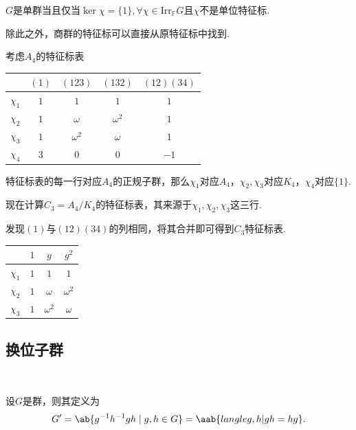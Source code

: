 \begin{theorem}[]
    $G$是单群当且仅当$\ker \chi = \{1\}, \forall \chi \in \mathrm{Irr}_{\mathbb{F}} G$且$\chi$不是单位特征标.
\end{theorem}

除此之外，商群的特征标可以直接从原特征标中找到.

\begin{instance}
    考虑$A_4$的特征标表
    \begin{center}
        \begin{tabular}{c|cccc}
                     & $(1)$ & $(123)$    & $(132)$    & $(12)(34)$ \\ \hline
            $\chi_1$ & $1$   & $1$        & $1$        & $1$        \\
            $\chi_2$ & $1$   & $\omega$   & $\omega^2$ & $1$        \\
            $\chi_3$ & $1$   & $\omega^2$ & $\omega$   & $1$        \\
            $\chi_4$ & $3$   & $0$        & $0$        & $-1$
        \end{tabular}
    \end{center}
    特征标表的每一行对应$A_4$的正规子群，那么$\chi_1$对应$A_4$，$\chi_2, \chi_3$对应$K_4$，$\chi_4$对应$\{1\}$.\par
    现在计算$C_3 = A_4 / K_4$的特征标表，其来源于$\chi_1,\chi_2,\chi_3$这三行.\par
    发现$(1)$与$(12)(34)$的列相同，将其合并即可得到$C_3$特征标表.
    \begin{center}
        \begin{tabular}{c|ccc}
                     & $1$ & $g$        & $g^2$      \\ \hline
            $\chi_1$ & $1$ & $1$        & $1$        \\
            $\chi_2$ & $1$ & $\omega$   & $\omega^2$ \\
            $\chi_3$ & $1$ & $\omega^2$ & $\omega$
        \end{tabular}
    \end{center}
\end{instance}

\subsection*{换位子群}{\textcolor{white}{1}}

\begin{definition}[换位子群]
    设$G$是群，则其定义为
    \begin{equation*}
        G'= \ab\{g^{-1}h^{-1}gh \mid g, h \in G\}=\aab{langle g,h|gh=hg}.
    \end{equation*}
\end{definition}

